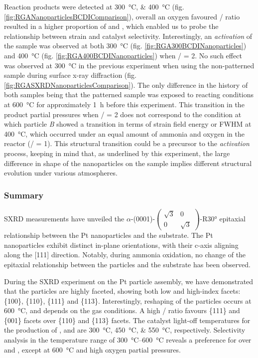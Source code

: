 Reaction products were detected at \qtylist{300;400}{\degreeCelsius} (fig. \ref{fig:RGANanoparticlesBCDIComparison}), overall an oxygen favoured / ratio resulted in a higher proportion of  and , which enabled us to probe the relationship between strain and catalyst selectivity.
Interestingly, an \textit{activation} of the sample was observed at both \qty{300}{\degreeCelsius} (fig. \ref{fig:RGA300BCDINanoparticles}) and \qty{400}{\degreeCelsius} (fig. \ref{fig:RGA400BCDINanoparticles}) when / = 2.
No such effect was observed at \qty{300}{\degreeCelsius} in the previous experiment when using the non-patterned sample during surface x-ray diffraction (fig. \ref{fig:RGASXRDNanoparticlesComparison}).
The only difference in the history of both samples being that the patterned sample was exposed to reacting conditions at \qty{600}{\degreeCelsius} for approximately \qty{1}{\hour} before this experiment.
This transition in the product partial pressures when / = 2 does not correspond to the condition at which particle \textit{B} showed a transition in terms of strain field energy or FWHM at \qty{400}{\degreeCelsius}, which occurred under an equal amount of ammonia and oxygen in the reactor (/ = 1).
This structural transition could be a precursor to the \textit{activation} process, keeping in mind that, as underlined by this experiment, the large difference in shape of the nanoparticles on the sample implies different structural evolution under various atmospheres.

\subsubsection{Summary}

SXRD measurements have unveiled the $\alpha$-(0001)-$\begin{pmatrix} \sqrt{3} & 0\\ 0 & \sqrt{3} \end{pmatrix}$-R\ang{30} epitaxial relationship between the Pt nanoparticles and the substrate.
The Pt nanoparticles exhibit distinct in-plane orientations, with their c-axis aligning along the [111] direction.
Notably, during ammonia oxidation, no change of the epitaxial relationship between the particles and the substrate has been observed.

During the SXRD experiment on the Pt particle assembly, we have demonstrated that the particles are highly faceted, showing both low and high-index facets: \{100\}, \{110\}, \{111\} and \{113\}.
Interestingly, reshaping of the particles occurs at \qty{600}{\degreeCelsius}, and depends on the gas conditions.
A high  /  ratio favours \{111\} and \{001\} facets over \{110\} and \{113\} facets.
The catalyst light-off temperatures for the production of ,  and  are \qtylist{300;450;550}{\degreeCelsius}, respectively.
Selectivity analysis in the temperature range of \qtyrange{300}{600}{\degreeCelsius} reveals a preference for  over  and , except at \qty{600}{\degreeCelsius} and high oxygen partial pressures.

